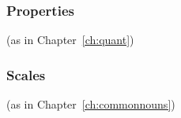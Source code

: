 
    

  
  

  
  
  



\subsubsection{Properties} (as in Chapter~\ref{ch:quant})

  



\subsubsection{Scales} (as in Chapter~\ref{ch:commonnouns})

  

  

